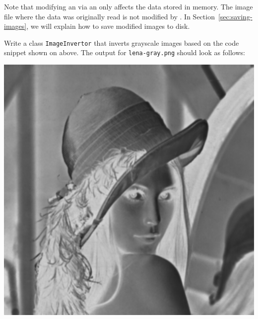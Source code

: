 \documentclass{book}
\begin{document}
Note that modifying an  via an  only affects the data stored in memory. The image file where the data was originally read is not modified by . In Section~\ref{sec:saving-images}, we will explain how to save modified images to disk.

\begin{exercise}\label{ex:invert}
Write a class \texttt{ImageInvertor} that inverts grayscale images based on the code snippet shown on above. The output for \texttt{lena-gray.png} should look as follows:
\begin{center}
\includegraphics[scale=0.2]{lena-gray-inverted.png}
\end{center}
\end{exercise}
\end{document}
